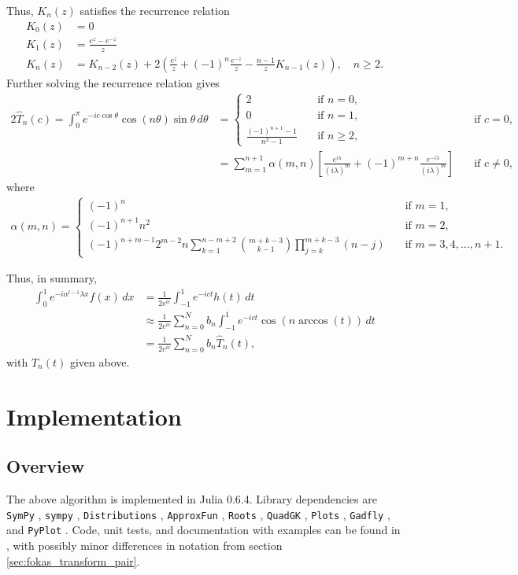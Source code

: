 \documentclass[12pt, oneside, a4paper]{article}
\begin{document}
Thus, $K_n(z)$ satisfies the recurrence relation
\begin{align*}
K_0(z) &= 0\\
K_1(z) &= \frac{e^z-e^{-z}}{z}\\
K_{n}(z) &= K_{n-2}(z) + 2\left(\frac{e^z}{z} + (-1)^{n}\frac{e^{-z}}{z} - \frac{n-1}{z}K_{n-1}(z)\right),\quad n\geq 2.
\end{align*}
Further solving the recurrence relation \cite{Fokas2012} gives
\begin{alignat*}{2}
    \hat{T}_n(c) = \int_0^\pi e^{-ic\cos\theta}\cos(n\theta)\sin\theta\,d\theta &= 
    \begin{cases}
        2 &\quad\mbox{if $n=0$},\\
        0 &\quad\mbox{if $n=1$},\\
        \frac{(-1)^{n+1}-1}{n^2-1} &\quad\mbox{if $n\geq 2$},
    \end{cases}
    &\quad\mbox{if $c=0$},\\
    &= \sum_{m=1}^{n+1}\alpha(m,n)\left[\frac{e^{i\lambda}}{(i\lambda)^m} + (-1)^{m+n}\frac{e^{-i\lambda}}{(i\lambda)^m}\right]&\quad\mbox{if $c\neq 0$},
\end{alignat*}
where
\begin{align*}
\alpha(m,n) =
\begin{cases}
(-1)^n&\quad\mbox{if $m=1$},\\
(-1)^{n+1}n^2&\quad\mbox{if $m=2$},\\
(-1)^{n+m-1}2^{m-2}n\sum_{k=1}^{n-m+2}\binom{m+k-3}{k-1}\prod_{j=k}^{m+k-3}(n-j)&\quad\mbox{if $m=3,4,\ldots,n+1$}.
\end{cases}
\end{align*}

Thus, in summary,
\begin{align*}
    \int_0^1 e^{-i\alpha^{l-1}\lambda x}f(x)\,dx &= \frac{1}{2e^{ic}}\int_{-1}^1 e^{-ict} h(t)\,dt\\
    &\approx \frac{1}{2e^{ic}}\sum_{n=0}^N b_n \int_{-1}^1 e^{-ict}\cos(n \arccos(t))\,dt\\
    &= \frac{1}{2e^{ic}}\sum_{n=0}^N b_n \hat{T}_n(t),
\end{align*}
with $\hat{T}_n(t)$ given above.

\section{Implementation}
\subsection{Overview}
The above algorithm is implemented in Julia 0.6.4. Library dependencies are \texttt{SymPy} \cite{sympy}, \texttt{sympy} \cite{sympyPython},  \texttt{Distributions} \cite{distributions}, \texttt{ApproxFun} \cite{approxfun}, \texttt{Roots} \cite{roots}, \texttt{QuadGK} \cite{quadgk}, \texttt{Plots} \cite{plots}, \texttt{Gadfly} \cite{gadfly}, and \texttt{PyPlot} \cite{pyplot}. Code, unit tests, and documentation with examples can be found in \cite{Xiao}, with possibly minor differences in notation from section \ref{sec:fokas_transform_pair}.
\end{document}
